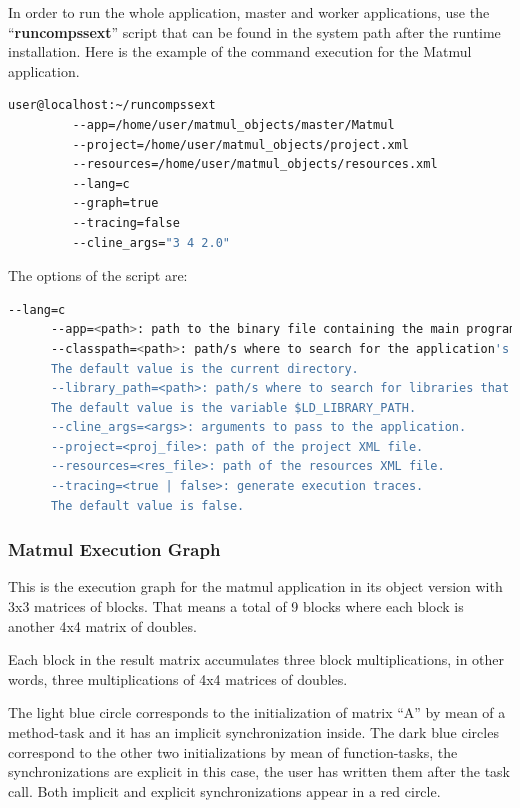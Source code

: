 In order to run the whole application, master and worker applications, use the ``{\bf runcompssext}'' script that can be found in the system path after the runtime installation. Here is the example of the command execution for the Matmul application.

\begin{lstlisting}[language=bash]
user@localhost:~/runcompssext
         --app=/home/user/matmul_objects/master/Matmul
         --project=/home/user/matmul_objects/project.xml
         --resources=/home/user/matmul_objects/resources.xml
         --lang=c
         --graph=true
         --tracing=false
         --cline_args="3 4 2.0"
\end{lstlisting}

The options of the script are:
\begin{lstlisting}[language=bash]
      --lang=c
      --app=<path>: path to the binary file containing the main program.
      --classpath=<path>: path/s where to search for the application's modules.
      The default value is the current directory.
      --library_path=<path>: path/s where to search for libraries that are not in a standard path.
      The default value is the variable $LD_LIBRARY_PATH.
      --cline_args=<args>: arguments to pass to the application.
      --project=<proj_file>: path of the project XML file.
      --resources=<res_file>: path of the resources XML file.
      --tracing=<true | false>: generate execution traces.
      The default value is false.
\end{lstlisting}

\subsubsection{Matmul Execution Graph}
This is the execution graph for the matmul application in its object version with 3x3 matrices of blocks. That means a total of 9 blocks where each block is another 4x4 matrix of doubles.

Each block in the result matrix accumulates three block multiplications, in other words, three multiplications of 4x4 matrices of doubles.

The light blue circle corresponds to the initialization of matrix ``A'' by mean of a method-task and it has an implicit synchronization inside. The dark blue circles correspond to the other two initializations by mean of function-tasks, the synchronizations are explicit in this case, the user has written them after the task call. Both implicit and explicit synchronizations appear in a red circle.

